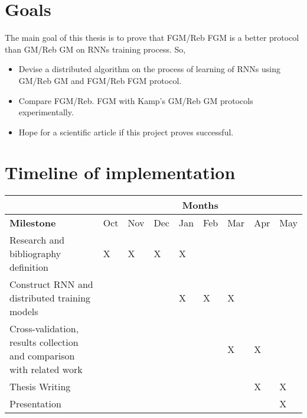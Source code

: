 \documentclass{article}
\begin{document}
    \section*{Goals}
    The main goal of this thesis is to prove that FGM/Reb FGM is a better protocol than GM/Reb GM on RNNs training process.
    So, \\
    \begin{itemize}
        \item Devise a distributed algorithm on the process of learning of RNNs using GM/Reb GM and FGM/Reb FGM protocol.
        \item Compare FGM/Reb.
        FGM with Kamp's GM/Reb GM protocols experimentally.
        \item Hope for a scientific article if this project proves successful.
    \end{itemize}

    \newpage
    \section*{Timeline of implementation}
    \begin{center}
        \begin{tabular}{|p{3.5cm}|p{0.5cm}|p{0.5cm}|p{0.5cm}|p{0.5cm}|p{0.5cm}|p{0.5cm}|p{0.5cm}|p{0.5cm}|}
            \hline
            \cellcolor{gray} & \multicolumn{8}{c|}{Months} \\
            \hline
            \textbf{Milestone} & Oct & Nov & Dec & Jan & Feb & Mar & Apr & May \\
            \hline
            Research and bibliography definition & X & X & X & X & & & &   \\
            \hline
            Construct RNN and distributed training models & & & & X & X & X & &   \\
            \hline
            Cross-validation, results collection and comparison with related work & & & & & & X & X &   \\
            \hline
            Thesis Writing & & & & & & & X & X  \\
            \hline
            Presentation & & & & & & & & X  \\
            \hline
        \end{tabular}
    \end{center}

    \section*{}~\nocite{*}
    \printbibliography
\end{document}
